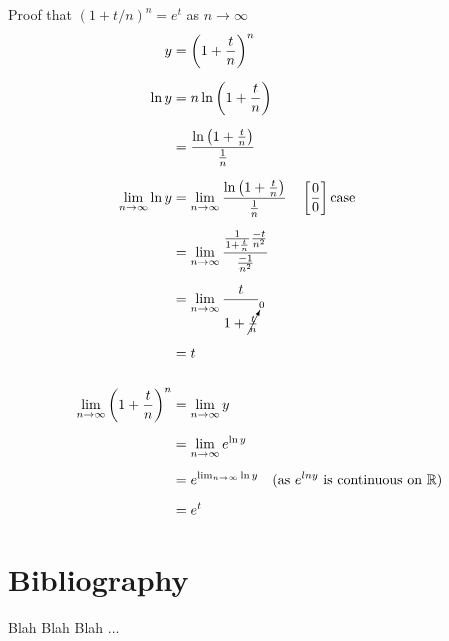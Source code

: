 \documentclass[titlepage,12 pt]{article}
\newcommand{\R}{{\mathbb R}}
\begin{document}
Proof that $(1+t/n)^n=e^t$ as $n\to\infty$
\begin{align*}
y&=\left( 1+\frac{t}{n} \right)^n \\[2mm]
\ln{y}&=n\ln{\left( 1+\frac{t}{n} \right)} \\[2mm]
&=\frac{\ln{\left( 1+\frac{t}{n} \right)}}{\frac{1}{n}} \\[2mm]
\lim_{n\to\infty} \ln{y} &= \lim_{n\to\infty} \frac{\ln{\left( 1+\frac{t}{n} \right)}}{\frac{1}{n}} \quad \left[ \frac{0}{0} \right ] \text{case} \\[2mm]
&= \lim_{n\to\infty} \frac{\frac{1}{1+\frac{t}{n}}\frac{-t}{n^2}}{\frac{-1}{n^2}} \\[2mm]
&= \lim_{n\to\infty} \frac{t}{1+\cancelto{0}{\frac{t}{n}}} \\[2mm]
&=t \\[5mm]
\lim_{n\to\infty} \left( 1+\frac{t}{n} \right)^n&= \lim_{n\to\infty} y \\[2mm]
&=\lim_{n\to\infty} e^{\ln{y}} \\[2mm]
&=e^{\lim_{n\to\infty} \ln{y}} \quad (\text{as $e^{lny}$ is continuous on $\R$})\\[2mm]
&=e^t
\end{align*}

\section{Bibliography}

Blah Blah Blah ...
\end{document}
